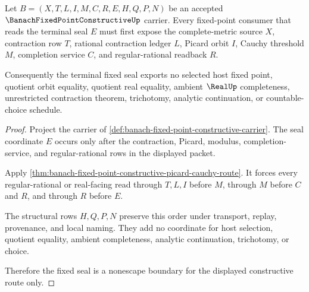 \begin{theorem}
\label{thm:banach-fixed-point-constructive-fixed-seal-nonescape}
Let $B=(X,T,L,I,M,C,R,E,H,Q,P,N)$ be an accepted $\BanachFixedPointConstructiveUp$ carrier. Every fixed-point consumer that reads the terminal seal $E$ must first expose the complete-metric source $X$, contraction row $T$, rational contraction ledger $L$, Picard orbit $I$, Cauchy threshold $M$, completion service $C$, and regular-rational readback $R$.

Consequently the terminal fixed seal exports no selected host fixed point, quotient orbit equality, quotient real equality, ambient $\RealUp$ completeness, unrestricted contraction theorem, trichotomy, analytic continuation, or countable-choice schedule.
\end{theorem}
\begin{proof}
Project the carrier of \autoref{def:banach-fixed-point-constructive-carrier}. The seal coordinate $E$ occurs only after the contraction, Picard, modulus, completion-service, and regular-rational rows in the displayed packet.

Apply \autoref{thm:banach-fixed-point-constructive-picard-cauchy-route}. It forces every regular-rational or real-facing read through $T,L,I$ before $M$, through $M$ before $C$ and $R$, and through $R$ before $E$.

The structural rows $H,Q,P,N$ preserve this order under transport, replay, provenance, and local naming. They add no coordinate for host selection, quotient equality, ambient completeness, analytic continuation, trichotomy, or choice.

Therefore the fixed seal is a nonescape boundary for the displayed constructive route only.
\end{proof}


